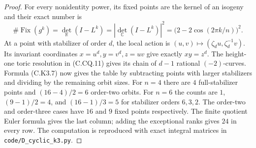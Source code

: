 \begin{proof}
For every nonidentity power, its fixed points are the
kernel of an isogeny and their exact number is
\[
 \#\operatorname{Fix}(g^k)
 =\det_{\mathbb R}(I-L^k)
 =|\det_{\mathbb C}(I-L^k)|^2
 =\bigl(2-2\cos(2\pi k/n)\bigr)^2.
                                                               \tag{C.K3.7}
\]
At a point with stabilizer of order $d$, the local
action is $(u,v)\mapsto(\zeta_du,\zeta_d^{-1}v)$.
Its invariant coordinates $x=u^d,y=v^d,z=uv$ give
exactly $xy=z^d$. The height-one toric resolution
in (C.CQ.11) gives its chain of $d-1$ rational
$(-2)$-curves. Formula (C.K3.7) now gives the table
by subtracting points with larger stabilizers and
dividing by the remaining orbit sizes. For $n=4$
there are $4$ full-stabilizer points and
$(16-4)/2=6$ order-two orbits. For $n=6$ the
counts are $1$, $(9-1)/2=4$, and
$(16-1)/3=5$ for stabilizer orders $6,3,2$.
The order-two and order-three cases have $16$ and
$9$ fixed points respectively. The finite quotient
Euler formula gives the last column; adding the
exceptional ranks gives $24$ in every row.
The computation is reproduced with exact integral
matrices in \texttt{code/D\_cyclic\_k3.py}.


\end{proof}
